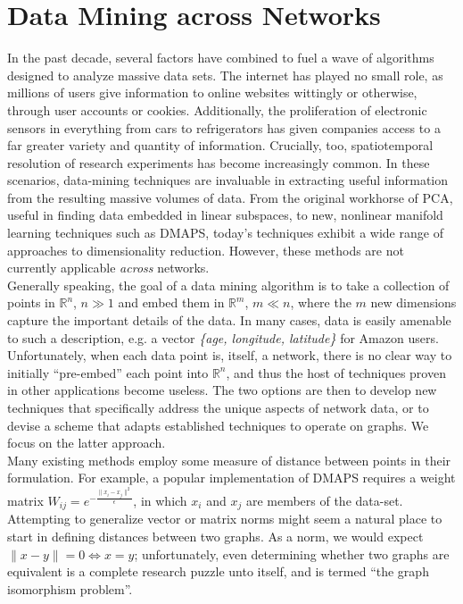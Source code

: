 \documentclass[11pt]{article}
\begin{document}
\section{Data Mining across Networks}
\label{sec:DM}
\indent In the past decade, several factors have combined to fuel a wave of algorithms designed to analyze massive data sets. The internet has played no small role, as millions of users give information to online websites wittingly or otherwise, through user accounts or cookies. Additionally, the proliferation of electronic sensors in everything from cars to refrigerators has given companies access to a far greater variety and quantity of information. Crucially, too, spatiotemporal resolution of research experiments has become increasingly common. In these scenarios, data-mining techniques are invaluable in extracting useful information from the resulting massive volumes of data. From the original workhorse of PCA, useful in finding data embedded in linear subspaces, to new, nonlinear manifold learning techniques such as DMAPS, today's techniques exhibit a wide range of approaches to dimensionality reduction. However, these methods are not currently applicable \textit{across} networks. \vspace{1mm}\\ 
\indent Generally speaking, the goal of a data mining algorithm is to take a collection of points in $\mathbb{R}^{n}$, $n\gg1$ and embed them in $\mathbb{R}^{m}$, $m \ll n$, where the $m$ new dimensions capture the important details of the data. In many cases, data is easily amenable to such a description, e.g. a vector \textit{\{age, longitude, latitude\}} for Amazon users. Unfortunately, when each data point is, itself, a network, there is no clear way to initially ``pre-embed'' each point into $\mathbb{R}^{n}$, and thus the host of techniques proven in other applications become useless. The two options are then to develop new techniques that specifically address the unique aspects of network data, or to devise a scheme that adapts established techniques to operate on graphs. We focus on the latter approach. \vspace{1mm}\\
\indent Many existing methods employ some measure of distance between points in their formulation. For example, a popular implementation of DMAPS requires a weight matrix $W_{ij}=e^{-\frac{\|x_{i}-x_{j}\|^{2}}{\epsilon}}$, in which $x_{i}$ and $x_{j}$ are members of the data-set. Attempting to generalize vector or matrix norms might seem a natural place to start in defining distances between two graphs. As a norm, we would expect $\| x - y \| = 0 \Leftrightarrow x = y$; unfortunately, even determining whether two graphs are equivalent is a complete research puzzle unto itself, and is termed ``the graph isomorphism problem''.
\end{document}
